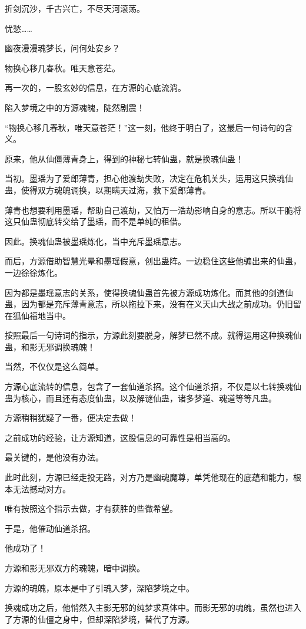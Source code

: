 \begin{this_body}
折剑沉沙，千古兴亡，不尽天河滚荡。

忧愁……

幽夜漫漫魂梦长，问何处安乡？

物换心移几春秋。唯天意苍茫。

再一次的，一股玄妙的信息，在方源的心底流淌。

陷入梦境之中的方源魂魄，陡然剧震！

“物换心移几春秋，唯天意苍茫！”这一刻，他终于明白了，这最后一句诗句的含义。

原来，他从仙僵薄青身上，得到的神秘七转仙蛊，就是换魂仙蛊！

当初。墨瑶为了爱郎薄青，担心他渡劫失败，决定在危机关头，运用这只换魂仙蛊，使得双方魂魄调换，以期瞒天过海，救下爱郎薄青。

薄青也想要利用墨瑶，帮助自己渡劫，又怕万一浩劫影响自身的意志。所以干脆将这只仙蛊彻底转交给了墨瑶，而不是单纯的租借。

因此。换魂仙蛊被墨瑶炼化，当中充斥墨瑶意志。

而后，方源借助智慧光晕和墨瑶假意，创出蛊阵。一边稳住这些他骗出来的仙蛊，一边徐徐炼化。

因为都是墨瑶意志的关系，使得换魂仙蛊首先被方源成功炼化。而其他的剑道仙蛊，因为都是充斥薄青意志，所以拖拉下来，没有在义天山大战之前成功。仍旧留在狐仙福地当中。

按照最后一句诗词的指示，方源此刻要脱身，解梦已然不成。就得运用这种换魂仙蛊，和影无邪调换魂魄！

当然，不仅仅是这么简单。

方源心底流转的信息，包含了一套仙道杀招。这个仙道杀招，不仅是以七转换魂仙蛊为核心，而且还有态度仙蛊，以及解谜仙蛊，诸多梦道、魂道等等凡蛊。

方源稍稍犹疑了一番，便决定去做！

之前成功的经验，让方源知道，这股信息的可靠性是相当高的。

最关键的，是他没有办法。

此时此刻，方源已经走投无路，对方乃是幽魂魔尊，单凭他现在的底蕴和能力，根本无法撼动对方。

唯有按照这个指示去做，才有获胜的些微希望。

于是，他催动仙道杀招。

他成功了！

方源和影无邪双方的魂魄，暗中调换。

方源的魂魄，原本是中了引魂入梦，深陷梦境之中。

换魂成功之后，他悄然入主影无邪的纯梦求真体中。而影无邪的魂魄，虽然也进入了方源的仙僵之身中，但却深陷梦境，替代了方源。


\end{this_body}
